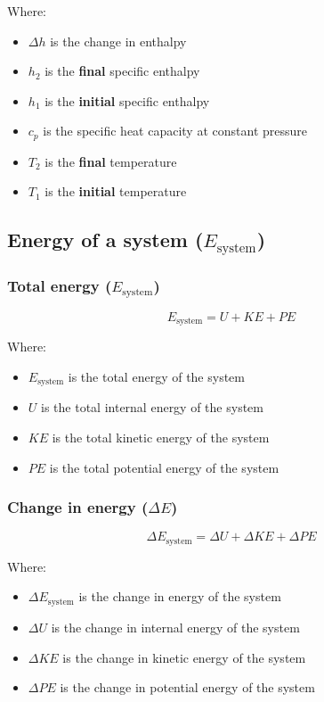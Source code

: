 \documentclass[11pt]{article}
\begin{document}
Where:
\begin{itemize}
\item \(\Delta h\) is the change in enthalpy
\item \(h_2\) is the \textbf{final} specific enthalpy
\item \(h_1\) is the \textbf{initial} specific enthalpy
\item \(c_p\) is the specific heat capacity at constant pressure
\item \(T_2\) is the \textbf{final} temperature
\item \(T_1\) is the \textbf{initial} temperature
\end{itemize}
\subsection{Energy of a system (\(E_{\text{system}}\))}
\label{sec:orgc16e58f}

\subsubsection{Total energy (\(E_{\text{system}}\))}
\label{sec:orgb2ca231}
\[E_{\text{system}} = U + KE + PE\]

Where:
\begin{itemize}
\item \(E_{\text{system}}\) is the total energy of the system
\item \(U\) is the total internal energy of the system
\item \(KE\) is the total kinetic energy of the system
\item \(PE\) is the total potential energy of the system
\end{itemize}

\newpage
\subsubsection{Change in energy (\(\Delta E\))}
\label{sec:orgeee0d96}
\[\Delta E_{\text{system}} = \Delta U + \Delta KE + \Delta PE\]

Where:
\begin{itemize}
\item \(\Delta E_{\text{system}}\) is the change in energy of the system
\item \(\Delta U\) is the change in internal energy of the system
\item \(\Delta KE\) is the change in kinetic energy of the system
\item \(\Delta PE\) is the change in potential energy of the system
\end{itemize}
\end{document}

